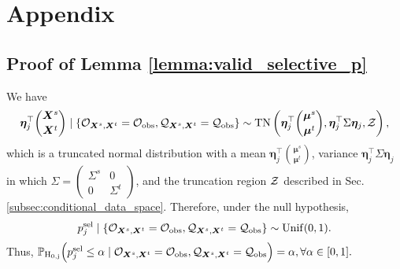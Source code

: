 \section{Appendix} \label{sec:appx}



\subsection{Proof of Lemma \ref{lemma:valid_selective_p}} \label{appx:proof_valid_selective_p}

We have 
\[
\bm \eta_j^\top {\bm X^s \choose \bm X^t} \mid
	\left \{  
	{\mathcal O}_{\bm X^s, \bm X^t}
	=
	{\mathcal O}_{\rm obs},
	{\mathcal Q}_{\bm X^s, \bm X^t}
	=
	{\mathcal Q}_{\rm obs}
	\right \} 
	\sim 
	{\rm TN} 
	\left (
	\bm \eta_j^\top 
	{\bm \mu^s \choose \bm \mu^t},
	\bm \eta_j^\top \Sigma \bm \eta_j,
	{\mathcal Z}
	\right ),
\]
which is a truncated normal distribution with a mean $\bm \eta_j^\top {\bm \mu^s \choose \bm \mu^t}$,
 variance $\bm \eta_j^\top \Sigma \bm \eta_j$ in which $
\Sigma = 
\begin{pmatrix}
	\Sigma^s & 0 \\ 
	0 & \Sigma^t
\end{pmatrix}
$, and the truncation region ${\mathcal Z}$ described in Sec. \ref{subsec:conditional_data_space}.
%
Therefore, under the null hypothesis,
\begin{align*}
	p_j^{\rm sel}
	\mid 
	\{ {\mathcal O}_{\bm X^s, \bm X^t}
	=
	{\mathcal O}_{\rm obs},
	{\mathcal Q}_{\bm X^s, \bm X^t}
	=
	{\mathcal Q}_{\rm obs}
	\}
	\sim {\rm Unif}(0, 1).
\end{align*} 
%
Thus,
%
$
	\mathbb{P}_{\rm H_{0, j}}  \Big (
	p_j^{\rm sel} \leq \alpha
	\mid 
	{\mathcal O}_{\bm X^s, \bm X^t}
	=
	{\mathcal O}_{\rm obs},
	{\mathcal Q}_{\bm X^s, \bm X^t}
	=
	{\mathcal Q}_{\rm obs}
	\Big) = \alpha, \forall \alpha \in [0, 1].
$

